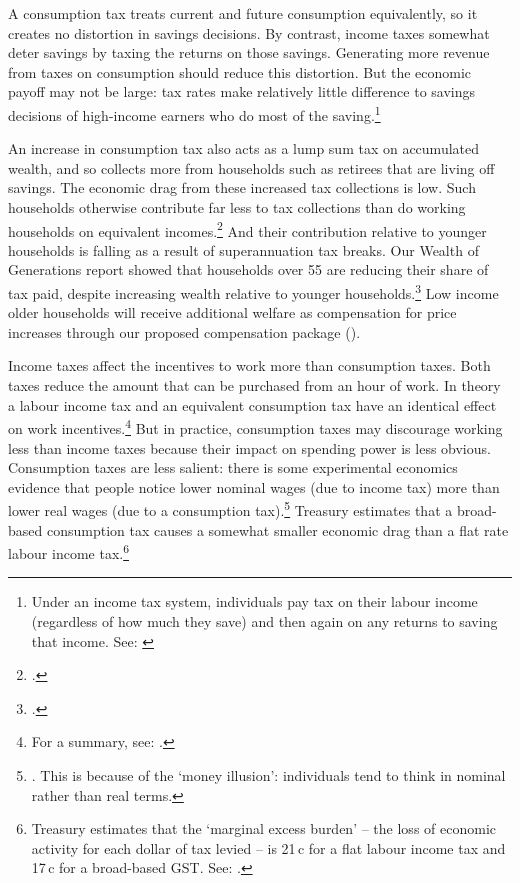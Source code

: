 \documentclass{grattanAlpha}
\begin{document}
A consumption tax treats current and future consumption equivalently, so it creates no distortion in savings decisions. By contrast, income taxes somewhat deter savings by taxing the returns on those savings.  Generating more revenue from taxes on consumption should reduce this distortion. But the economic payoff may not be large: tax rates make relatively little difference to savings decisions of high-income earners who do most of the saving.\footnote{Under an income tax system, individuals pay tax on their labour income (regardless of how much they save) and then again on any returns to saving that income. See: \textcites{HenryTaxReview2010}[][18--22]{DaleyWood2015FiscalChallenges}}    

An increase in consumption tax also acts as a lump sum tax on accumulated wealth, and so collects more from households such as retirees that are living off savings. The economic drag from these increased tax collections is low. Such households otherwise contribute far less to tax collections than do working households on equivalent incomes.\footcite[][7,13]{DaleyWood2015FiscalChallenges}  And their contribution relative to younger households is falling as a result of superannuation tax breaks. Our Wealth of Generations report showed that households over 55 are reducing their share of tax paid, despite increasing wealth relative to younger households.\footcite[][27]{DaleyWoodWeidmannEtAl2014}  Low income older households will receive additional welfare as compensation for price increases through our proposed compensation package ().

Income taxes affect the incentives to work more than consumption taxes. Both taxes reduce the amount that can be purchased from an hour of work. In theory a labour income tax and an equivalent consumption tax have an identical effect on work incentives.\footnote{For a summary, see: \textcite[][458]{McCaffry2008}.}  But in practice, consumption taxes may discourage working less than income taxes because their impact on spending power is less obvious. Consumption taxes are less salient: there is some experimental economics evidence that people notice lower nominal wages (due to income tax) more than lower real wages (due to a consumption tax).\footnote{\textcites{BlumkinRuffleGanun2012}{SausgruberTyran2005}. This is because of the ‘money illusion’: individuals tend to think in nominal rather than real terms.}  Treasury estimates that a broad-based consumption tax causes a somewhat smaller economic drag than a flat rate labour income tax.\footnote{Treasury estimates that the ‘marginal excess burden’ – the loss of economic activity for each dollar of tax levied – is 21\,c for a flat labour income tax and 17\,c for a broad-based GST. See: \textcite[][25]{Treasury2015ReThink}.}  
\end{document}
